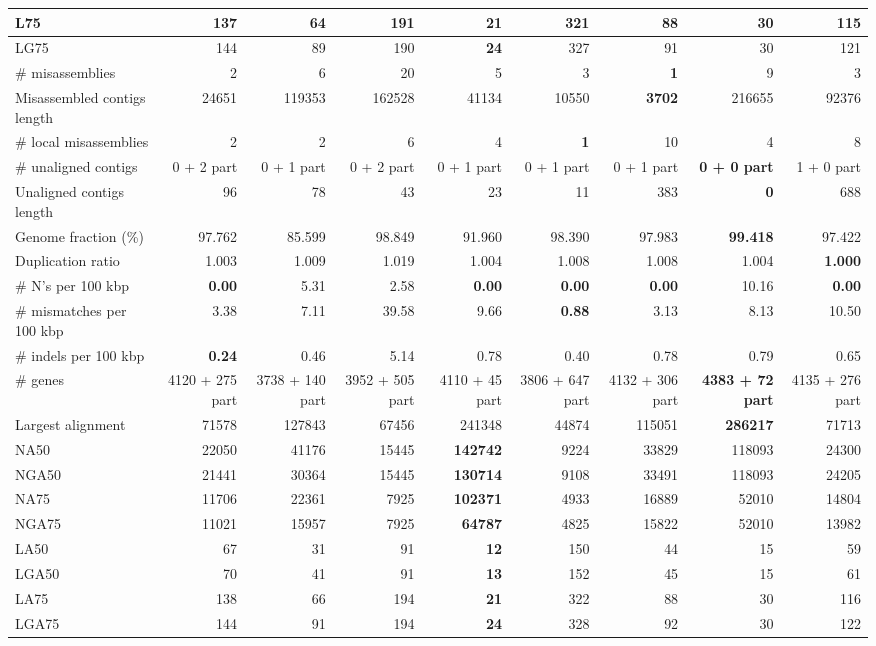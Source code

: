 \documentclass[12pt,a4paper]{article}
\begin{document}
\begin{table}[ht]
\begin{center}
\begin{tabular}{|l*{8}{|r}|}
L75 & 137 & 64 & 191 & {\bf 21} & 321 & 88 & 30 & 115 \\ \hline
LG75 & 144 & 89 & 190 & {\bf 24} & 327 & 91 & 30 & 121 \\ \hline
\# misassemblies & 2 & 6 & 20 & 5 & 3 & {\bf 1} & 9 & 3 \\ \hline
Misassembled contigs length & 24651 & 119353 & 162528 & 41134 & 10550 & {\bf 3702} & 216655 & 92376 \\ \hline
\# local misassemblies & 2 & 2 & 6 & 4 & {\bf 1} & 10 & 4 & 8 \\ \hline
\# unaligned contigs & 0 + 2 part & 0 + 1 part & 0 + 2 part & 0 + 1 part & 0 + 1 part & 0 + 1 part & {\bf 0 + 0 part} & 1 + 0 part \\ \hline
Unaligned contigs length & 96 & 78 & 43 & 23 & 11 & 383 & {\bf 0} & 688 \\ \hline
Genome fraction (\%) & 97.762 & 85.599 & 98.849 & 91.960 & 98.390 & 97.983 & {\bf 99.418} & 97.422 \\ \hline
Duplication ratio & 1.003 & 1.009 & 1.019 & 1.004 & 1.008 & 1.008 & 1.004 & {\bf 1.000} \\ \hline
\# N's per 100 kbp & {\bf 0.00} & 5.31 & 2.58 & {\bf 0.00} & {\bf 0.00} & {\bf 0.00} & 10.16 & {\bf 0.00} \\ \hline
\# mismatches per 100 kbp & 3.38 & 7.11 & 39.58 & 9.66 & {\bf 0.88} & 3.13 & 8.13 & 10.50 \\ \hline
\# indels per 100 kbp & {\bf 0.24} & 0.46 & 5.14 & 0.78 & 0.40 & 0.78 & 0.79 & 0.65 \\ \hline
\# genes & 4120 + 275 part & 3738 + 140 part & 3952 + 505 part & 4110 + 45 part & 3806 + 647 part & 4132 + 306 part & {\bf 4383 + 72 part} & 4135 + 276 part \\ \hline
Largest alignment & 71578 & 127843 & 67456 & 241348 & 44874 & 115051 & {\bf 286217} & 71713 \\ \hline
NA50 & 22050 & 41176 & 15445 & {\bf 142742} & 9224 & 33829 & 118093 & 24300 \\ \hline
NGA50 & 21441 & 30364 & 15445 & {\bf 130714} & 9108 & 33491 & 118093 & 24205 \\ \hline
NA75 & 11706 & 22361 & 7925 & {\bf 102371} & 4933 & 16889 & 52010 & 14804 \\ \hline
NGA75 & 11021 & 15957 & 7925 & {\bf 64787} & 4825 & 15822 & 52010 & 13982 \\ \hline
LA50 & 67 & 31 & 91 & {\bf 12} & 150 & 44 & 15 & 59 \\ \hline
LGA50 & 70 & 41 & 91 & {\bf 13} & 152 & 45 & 15 & 61 \\ \hline
LA75 & 138 & 66 & 194 & {\bf 21} & 322 & 88 & 30 & 116 \\ \hline
LGA75 & 144 & 91 & 194 & {\bf 24} & 328 & 92 & 30 & 122 \\ \hline
\end{tabular}
\end{center}
\end{table}
\end{document}
